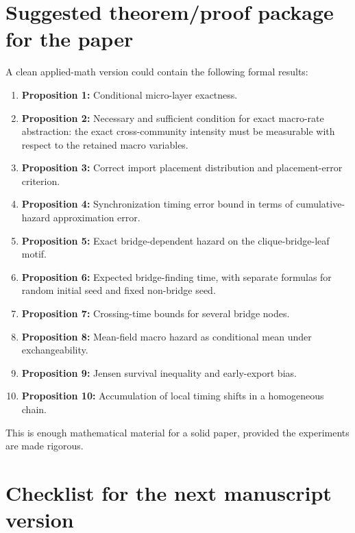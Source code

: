 \documentclass[12pt,a4paper]{article}
\theoremstyle{definition}
\newcommand{\1}{\mathbf{1}}
\begin{document}
\section{Suggested theorem/proof package for the paper}

A clean applied-math version could contain the following formal results:
\begin{enumerate}
    \item \textbf{Proposition 1:} Conditional micro-layer exactness.
    \item \textbf{Proposition 2:} Necessary and sufficient condition for exact macro-rate abstraction: the exact cross-community intensity must be measurable with respect to the retained macro variables.
    \item \textbf{Proposition 3:} Correct import placement distribution and placement-error criterion.
    \item \textbf{Proposition 4:} Synchronization timing error bound in terms of cumulative-hazard approximation error.
    \item \textbf{Proposition 5:} Exact bridge-dependent hazard on the clique-bridge-leaf motif.
    \item \textbf{Proposition 6:} Expected bridge-finding time, with separate formulas for random initial seed and fixed non-bridge seed.
    \item \textbf{Proposition 7:} Crossing-time bounds for several bridge nodes.
    \item \textbf{Proposition 8:} Mean-field macro hazard as conditional mean under exchangeability.
    \item \textbf{Proposition 9:} Jensen survival inequality and early-export bias.
    \item \textbf{Proposition 10:} Accumulation of local timing shifts in a homogeneous chain.
\end{enumerate}
This is enough mathematical material for a solid paper, provided the experiments are made rigorous.

\section{Checklist for the next manuscript version}
\end{document}
